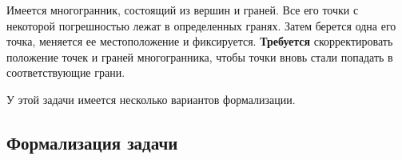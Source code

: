\documentclass[a4paper,12pt, titlepage]{article}
\begin{document}
\begin{flushleft}
  Имеется многогранник, состоящий из вершин и граней. Все его точки с некоторой
погрешностью лежат в определенных гранях. Затем берется одна его точка,
меняется ее местоположение и фиксируется. \textbf{Требуется} скорректировать положение
точек и граней многогранника, чтобы точки вновь стали попадать в соответствующие
грани.
\end{flushleft}

\begin{flushleft}
  У этой задачи имеется несколько вариантов формализации.
\end{flushleft}

\subsection{Формализация задачи}
\end{document}
